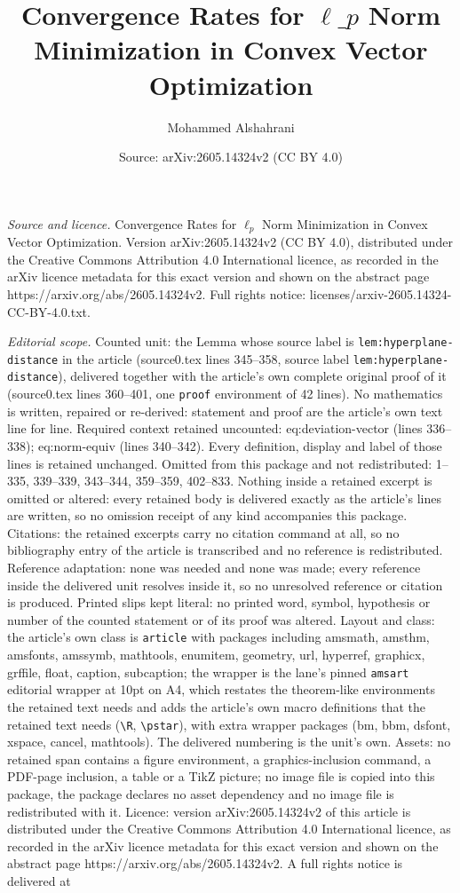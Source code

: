 \documentclass[10pt,a4paper]{amsart}
\title[Convergence Rates for $\ell\_p$ Norm Minimization in Convex V]{Convergence Rates for $\ell\_p$ Norm Minimization in Convex Vector Optimization}
\author{Mohammed Alshahrani}
\date{Source: arXiv:2605.14324v2 (CC BY 4.0)}
\begin{document}
\maketitle

\noindent\emph{Source and licence.} Convergence Rates for $\ell_p$ Norm Minimization in Convex Vector Optimization. Version arXiv:2605.14324v2 (CC BY 4.0), distributed under the Creative Commons Attribution 4.0 International licence, as recorded in the arXiv licence metadata for this exact version and shown on the abstract page https://arxiv.org/abs/2605.14324v2. Full rights notice: licenses/arxiv-2605.14324-CC-BY-4.0.txt.\par\smallskip

\noindent\textit{Editorial scope.} Counted unit: the Lemma whose source label is \texttt{lem:hyperplane-distance} in the article (source0.tex lines 345--358, source label \texttt{lem:hyperplane-distance}), delivered together with the article's own complete original proof of it (source0.tex lines 360--401, one \texttt{proof} environment of 42 lines). No mathematics is written, repaired or re-derived: statement and proof are the article's own text line for line. Required context retained uncounted: eq:deviation-vector (lines 336--338); eq:norm-equiv (lines 340--342). Every definition, display and label of those lines is retained unchanged. Omitted from this package and not redistributed: 1--335, 339--339, 343--344, 359--359, 402--833. Nothing inside a retained excerpt is omitted or altered: every retained body is delivered exactly as the article's lines are written, so no omission receipt of any kind accompanies this package. Citations: the retained excerpts carry no citation command at all, so no bibliography entry of the article is transcribed and no reference is redistributed. Reference adaptation: none was needed and none was made; every reference inside the delivered unit resolves inside it, so no unresolved reference or citation is produced. Printed slips kept literal: no printed word, symbol, hypothesis or number of the counted statement or of its proof was altered. Layout and class: the article's own class is \texttt{article} with packages including amsmath, amsthm, amsfonts, amssymb, mathtools, enumitem, geometry, url, hyperref, graphicx, grffile, float, caption, subcaption; the wrapper is the lane's pinned \texttt{amsart} editorial wrapper at 10pt on A4, which restates the theorem-like environments the retained text needs and adds the article's own macro definitions that the retained text needs (\texttt{\textbackslash R}, \texttt{\textbackslash pstar}), with extra wrapper packages (bm, bbm, dsfont, xspace, cancel, mathtools). The delivered numbering is the unit's own. Assets: no retained span contains a figure environment, a graphics-inclusion command, a PDF-page inclusion, a table or a TikZ picture; no image file is copied into this package, the package declares no asset dependency and no image file is redistributed with it. Licence: version arXiv:2605.14324v2 of this article is distributed under the Creative Commons Attribution 4.0 International licence, as recorded in the arXiv licence metadata for this exact version and shown on the abstract page https://arxiv.org/abs/2605.14324v2. A full rights notice is delivered at 
\end{document}
